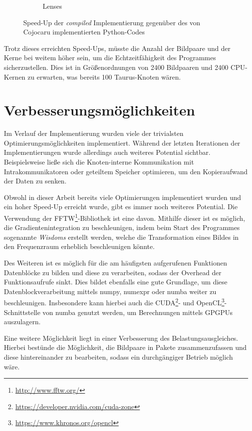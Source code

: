 \begin{center}
\begin{figure}[h]
\begin{subfigure}[b]{0.45\textwidth}
			\caption{Lenses}
			\label{fig:best_speedup_lenses}
		\end{subfigure}
		\caption{Speed-Up der \textit{compiled} Implementierung gegenüber des von Cojocaru implementierten Python-Codes}
		\label{fig:best_speedup}
	\end{figure}
\end{center}

Trotz dieses erreichten Speed-Ups, müsste die Anzahl der Bildpaare und der Kerne bei weitem höher sein, um die Echtzeitfähigkeit des Programmes sicherzustellen. Dies ist in Größenordnungen von 2400 Bildpaaren und 2400 \gls{CPU}-Kernen zu erwarten, was bereits 100 Taurus-Knoten wären. 

\section{Verbesserungsmöglichkeiten}

Im Verlauf der Implementierung wurden viele der trivialsten Optimierungsmöglichkeiten implementiert. Während der letzten Iterationen der Implementierungen wurde allerdings auch weiteres Potential sichtbar. Beispielsweise ließe sich die Knoten-interne Kommunikation mit Intrakommunikatoren oder geteiltem Speicher optimieren, um den Kopieraufwand der Daten zu senken. 

Obwohl in dieser Arbeit bereits viele Optimierungen implementiert wurden und ein hoher Speed-Up erreicht wurde, gibt es immer noch weiteres Potential. Die Verwendung der FFTW\footnote{\url{http://www.fftw.org/}}-Bibliothek ist eine davon. Mithilfe dieser ist es möglich, die Gradientenintegration zu beschleunigen, indem beim Start des Programmes sogenannte \textit{Wisdoms} erstellt werden, welche die Transformation eines Bildes in den Frequenzraum erheblich beschleunigen könnte. 

Des Weiteren ist es möglich für die am häufigsten aufgerufenen Funktionen Datenblöcke zu bilden und diese zu verarbeiten, sodass der Overhead der Funktionsaufrufe sinkt. Dies bildet ebenfalls eine gute Grundlage, um diese Datenblockverarbeitung mittels numpy, numexpr oder numba weiter zu beschleunigen. Insbesondere kann hierbei auch die CUDA\footnote{\url{https://developer.nvidia.com/cuda-zone}}- und OpenCL\footnote{\url{https://www.khronos.org/opencl}}-Schnittstelle von numba genutzt werden, um Berechnungen mittels \glspl{GPGPU} auszulagern. 

Eine weitere Möglichkeit liegt in einer Verbesserung des Belastungsausgleiches. Hierbei bestünde die Möglichkeit, die Bildpaare in Pakete zusammenzufassen und diese hintereinander zu bearbeiten, sodass ein durchgängiger Betrieb möglich wäre. 

